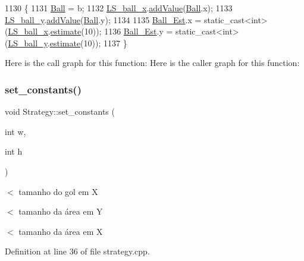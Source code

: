 \begin{DoxyCode}
1130                                  \{
1131     \hyperlink{class_strategy_abd16b6276e747f6cd99a19963ff5495b}{Ball} = b;
1132     \hyperlink{class_strategy_ab9ecf12e9440d653dd732674b78ce02b}{LS\_ball\_x}.\hyperlink{class_l_s_ac3843acd150a8668c7bdff35f080d902}{addValue}(\hyperlink{class_strategy_abd16b6276e747f6cd99a19963ff5495b}{Ball}.x);
1133     \hyperlink{class_strategy_aba301b4dd7bac24f2db4ca16c1f96608}{LS\_ball\_y}.\hyperlink{class_l_s_ac3843acd150a8668c7bdff35f080d902}{addValue}(\hyperlink{class_strategy_abd16b6276e747f6cd99a19963ff5495b}{Ball}.y);
1134 
1135     \hyperlink{class_strategy_ae629b11b862d24dba3fb3322659e439e}{Ball\_Est}.x = \textcolor{keyword}{static\_cast<}\textcolor{keywordtype}{int}\textcolor{keyword}{>}(\hyperlink{class_strategy_ab9ecf12e9440d653dd732674b78ce02b}{LS\_ball\_x}.\hyperlink{class_l_s_a595c287e25fe0d0d51e7f06a80f8f991}{estimate}(10));
1136     \hyperlink{class_strategy_ae629b11b862d24dba3fb3322659e439e}{Ball\_Est}.y = \textcolor{keyword}{static\_cast<}\textcolor{keywordtype}{int}\textcolor{keyword}{>}(\hyperlink{class_strategy_aba301b4dd7bac24f2db4ca16c1f96608}{LS\_ball\_y}.\hyperlink{class_l_s_a595c287e25fe0d0d51e7f06a80f8f991}{estimate}(10));
1137 \}
\end{DoxyCode}
Here is the call graph for this function\+:
Here is the caller graph for this function\+:
\mbox{\label{class_strategy_a00120223877a8f4a97ef2ef4f8cecb1b}} 
\subsubsection{\texorpdfstring{set\+\_\+constants()}{set\_constants()}}
{\footnotesize\ttfamily void Strategy\+::set\+\_\+constants (\begin{DoxyParamCaption}\item[{int}]{w,  }\item[{int}]{h }\end{DoxyParamCaption})}

$<$ tamanho do gol em X

$<$ tamanho da área em Y

$<$ tamanho da área em X 

Definition at line 36 of file strategy.\+cpp.



